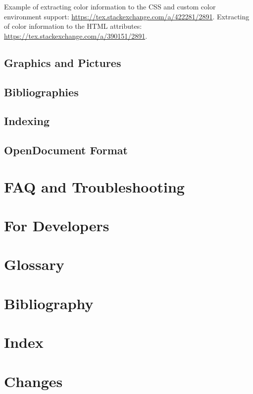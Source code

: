 \documentclass{book}
\begin{document}
Example of extracting color information to the CSS and custom color environment support:
\url{https://tex.stackexchange.com/a/422281/2891}. Extracting of color information to the HTML attributes:
\url{https://tex.stackexchange.com/a/390151/2891}.



\section{Graphics and Pictures}





\section{Bibliographies}
\section{Indexing}

\section{OpenDocument Format}



\chapter{FAQ and Troubleshooting}

\chapter{For Developers}
\label{sec:developers}


\chapter{Glossary}
\chapter{Bibliography}
\chapter{Index}
\chapter{Changes}

\end{document}
